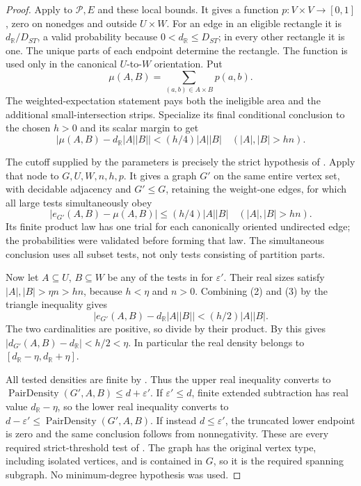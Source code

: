 \begin{proof}
Apply  to $\mathcal P,E$ and
these local bounds.
It gives a function $p:V\times V\to[0,1]$, zero on nonedges and
outside $U\times W$. For an edge in an eligible rectangle it is
$d_{\mathbb R}/D_{ST}$, a valid probability because
$0<d_{\mathbb R}\leq D_{ST}$; in every other rectangle it is one.
The unique parts of each endpoint determine the rectangle.
The function is used only in the canonical $U$-to-$W$ orientation.
Put
\[
 \mu(A,B)=\sum_{(a,b)\in A\times B}p(a,b).
\]
The weighted-expectation statement pays both the ineligible area
and the additional small-intersection strips. Specialize its final
conditional conclusion to the chosen $h>0$ and its scalar margin to get
\[
 |\mu(A,B)-d_{\mathbb R}|A||B||<(h/4)|A||B|
        \quad(|A|,|B|>hn).                             \tag{2}
\]

The cutoff supplied by the parameters is precisely the strict
hypothesis of . Apply that
node to $G,U,W,n,h,p$. It gives a graph $G'$ on the same entire
vertex set, with decidable adjacency and $G'\leq G$, retaining
the weight-one edges, for which all large tests simultaneously obey
\[
 |e_{G'}(A,B)-\mu(A,B)|\leq(h/4)|A||B|
        \quad(|A|,|B|>hn).                             \tag{3}
\]
Its finite product law has one trial for each canonically oriented
undirected edge; the probabilities were validated before forming
that law. The simultaneous conclusion uses all subset tests, not
only tests consisting of partition parts.

Now let $A\subseteq U$, $B\subseteq W$ be any of the tests in
 for $\varepsilon'$. Their real sizes satisfy
$|A|,|B|>\eta n>hn$, because $h<\eta$ and $n>0$.
Combining (2) and (3) by the triangle inequality gives
\[
 |e_{G'}(A,B)-d_{\mathbb R}|A||B||<(h/2)|A||B|.
\]
The two cardinalities are positive, so divide by their product.
By  this gives
$|d_{G'}(A,B)-d_{\mathbb R}|<h/2<\eta$.
In particular the real density belongs to
$[d_{\mathbb R}-\eta,d_{\mathbb R}+\eta]$.

All tested densities are finite by .
Thus the upper real inequality converts to
$\operatorname{PairDensity}(G',A,B)\leq d+\varepsilon'$.
If $\varepsilon'\leq d$, finite extended subtraction has real value
$d_{\mathbb R}-\eta$, so the lower real inequality converts to
$d-\varepsilon'\leq\operatorname{PairDensity}(G',A,B)$.
If instead $d\leq\varepsilon'$, the truncated lower endpoint is zero
and the same conclusion follows from nonnegativity.
These are every required strict-threshold test of
. The graph has the original vertex type,
including isolated vertices, and is contained in $G$, so it is the
required spanning subgraph. No minimum-degree hypothesis was used.
\end{proof}
